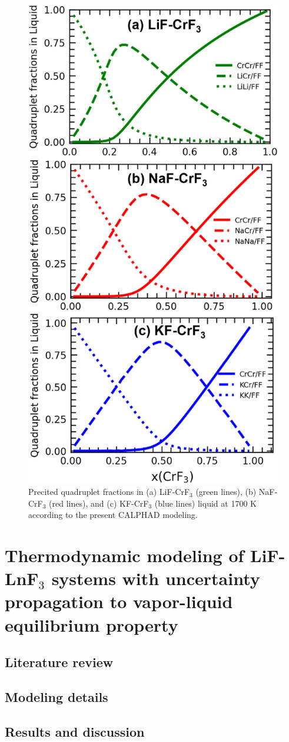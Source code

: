 \begin{figure}[H]
    \centering
    \includegraphics[width=0.5\linewidth]{moltensalts/Moltensalts-FLiNaKCr-QuadFrac.jpg}
    \caption{Precited quadruplet fractions in (a) LiF-CrF$_3$ (green lines), (b) NaF-CrF$_3$ (red lines), and (c) KF-CrF$_3$ (blue lines) liquid at 1700 K according to the present CALPHAD modeling. }
    \label{ms:fig:FLiNaKCr-QuadFrac}
\end{figure}

\section{Thermodynamic modeling of LiF-LnF${_3}$ systems with uncertainty propagation to vapor-liquid equilibrium property} \label{moltensalts:sec:LiFLnF3}

\subsection{Literature review} \label{moltensalts:ssec:LiFLnF3lit}


\subsection{Modeling details} \label{moltensalts:ssec:LiFLnF3model}


\subsection{Results and discussion} \label{moltensalts:ssec:LiFLnF3result}


